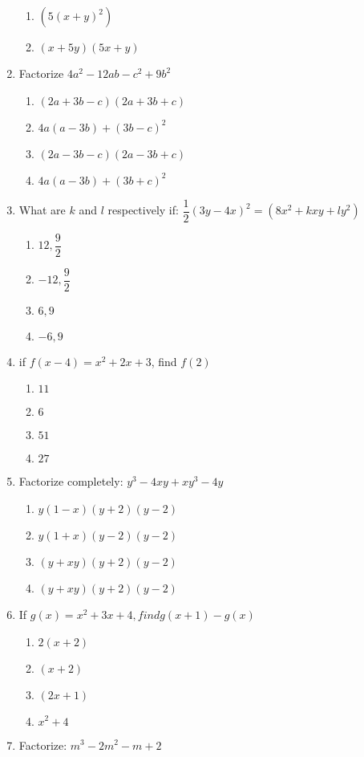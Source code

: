 \begin{multicols}{2}
\begin{enumerate}[label={\arabic*.}]
\begin{enumerate}[label={\Alph*.}]
	\item \((5(x+y)^2)\)
	\item \((x+5y)(5x+y)\)
	\end{enumerate}
\item Factorize \(4a^2-12ab-c^2+9b^2\)
	\begin{enumerate}[label={\Alph*.}]
	\item \((2a+3b-c)(2a+3b+c)\)
	\item \(4a(a-3b)+(3b-c)^2\)
	\item \((2a-3b-c)(2a-3b+c)\)
	\item \(4a(a-3b) + (3b+c)^2\)
	\end{enumerate}
\item What are \(k\) and \(l\) respectively if: \(\dfrac{1}{2}(3y-4x)^2 = (8{x}^{2}+kxy+ly^2)\)
	\begin{enumerate}[label={\Alph*.}]
	\item \(12, \dfrac{9}{2}\)
	\item \(-12, \dfrac{9}{2}\)
	\item \(6, 9\)
	\item \(-6, 9\)
	\end{enumerate}
\item if \(f(x-4) = {x}^{2}+2x+3\), find \(f(2)\)
	\begin{enumerate}[label={\Alph*.}]
	\item \(11\)
	\item \(6\)
	\item \(51\)
	\item \(27\)
	\end{enumerate}
\item Factorize completely: \(y^3-4xy+xy^3-4y\)
	\begin{enumerate}[label={\Alph*.}]
	\item \(y(1-x)(y+2)(y-2)\)
	\item \(y(1+x)(y-2)(y-2)\)
	\item \((y+xy)(y+2)(y-2)\)
	\item \((y+xy)(y+2)(y-2)\)
	\end{enumerate}
\item If \(g(x) = {x}^{2}+3x+4, find g(x+1) -g(x)\)
	\begin{enumerate}[label={\Alph*.}]
	\item \(2(x+2)\)
	\item \((x+2)\)
	\item \((2x+1)\)
	\item \({x}^{2}+4\)
	\end{enumerate}
\item Factorize: \(m^3-2m^2-m+2\)

\end{enumerate}
\end{multicols}
